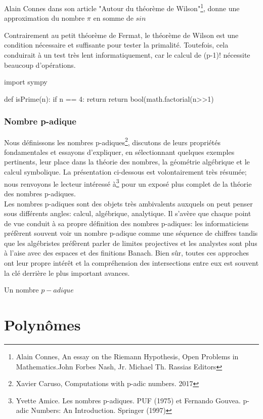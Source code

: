Alain Connes dans son article "Autour du théorème de Wilson"\footnote{Alain Connes, An essay on the Riemann Hypothesis, Open Problems in Mathematics.John Forbes Nash, Jr. Michael Th. Rassias Editors}, donne une approximation du nombre $\pi$ en somme de $sin$
\begin{remark}
Contrairement au petit théorème de Fermat, le théorème de Wilson est une condition nécessaire et suffisante pour tester la primalité. Toutefois, cela conduirait à un test très lent informatiquement, car le calcul de (p-1)! nécessite beaucoup d'opérations.
\end{remark}
\begin{python}
import sympy

def isPrime(n):
 if n == 4: return 
 return bool(math.factorial(n>>1)%
\end{python}
\subsection{Nombre p-adique}
Nous définissons les nombres p-adiques\footnote{Xavier Caruso, Computations with p-adic numbers. 2017}, discutons de leurs propriétés fondamentales et essayons d'expliquer, en sélectionnant quelques exemples pertinents, leur place dans la théorie des nombres, la géométrie algébrique et le calcul symbolique. La présentation ci-dessous est volontairement très résumée; nous renvoyons le lecteur intéressé à\footnote{Yvette Amice. Les nombres p-adiques. PUF (1975) et Fernando Gouvea. p-adic Numbers: An Introduction. Springer (1997) } pour un exposé plus complet de la théorie des nombres p-adiques.
\\
Les nombres p-adiques sont des objets très ambivalents auxquels on peut penser sous différents angles:
calcul, algébrique, analytique. Il s'avère que chaque point de vue conduit à sa propre définition
des nombres p-adiques: les informaticiens préfèrent souvent voir un nombre p-adique comme une séquence de
chiffres tandis que les algébristes préfèrent parler de limites projectives et les analystes sont plus à l'aise
avec des espaces et des finitions Banach. Bien sûr, toutes ces approches ont leur propre intérêt
et la compréhension des intersections entre eux est souvent la clé derrière le plus important
avances.
\begin{definition}
Un nombre $p-adique$
\end{definition}
\chapter{Polynômes}

